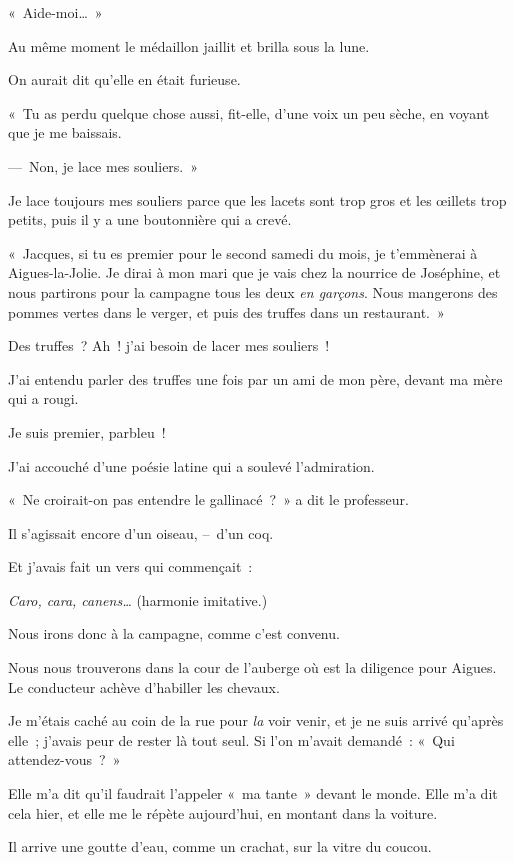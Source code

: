 \documentclass[french,twoside]{book} %
\begin{document}
« Aide-moi… »\par
Au même moment le médaillon jaillit et brilla sous la lune.\par
On aurait dit qu’elle en était furieuse.\par
« Tu as perdu quelque chose aussi, fit-elle, d’une voix un peu sèche, en voyant que je me baissais.\par
— Non, je lace mes souliers. »\par
Je lace toujours mes souliers parce que les lacets sont trop gros et les œillets trop petits, puis il y a une boutonnière qui a crevé.\par
\bigbreak
\noindent « Jacques, si tu es premier pour le second samedi du mois, je t’emmènerai à Aigues-la-Jolie. Je dirai à mon mari que je vais chez la nourrice de Joséphine, et nous partirons pour la campagne tous les deux \emph{en garçons}. Nous mangerons des pommes vertes dans le verger, et puis des truffes dans un restaurant. »\par
Des truffes ? Ah ! j’ai besoin de lacer mes souliers !\par
J’ai entendu parler des truffes une fois par un ami de mon père, devant ma mère qui a rougi.\par
\bigbreak
\noindent Je suis premier, parbleu !\par
J’ai accouché d’une poésie latine qui a soulevé l’admiration.\par
« Ne croirait-on pas entendre le gallinacé ? » a dit le professeur.\par
Il s’agissait encore d’un oiseau, – d’un coq.\par
Et j’avais fait un vers qui commençait :\par
\emph{Caro, cara, canens…} (harmonie imitative.)\par
Nous irons donc à la campagne, comme c’est convenu.\par
\bigbreak
\noindent Nous nous trouverons dans la cour de l’auberge où est la diligence pour Aigues. Le conducteur achève d’habiller les chevaux.\par
Je m’étais caché au coin de la rue pour \emph{la} voir venir, et je ne suis arrivé qu’après elle ; j’avais peur de rester là tout seul. Si l’on m’avait demandé : « Qui attendez-vous ? »\par
Elle m’a dit qu’il faudrait l’appeler « ma tante » devant le monde. Elle m’a dit cela hier, et elle me le répète aujourd’hui, en montant dans la voiture.\par
Il arrive une goutte d’eau, comme un crachat, sur la vitre du coucou.\par
\end{document}
